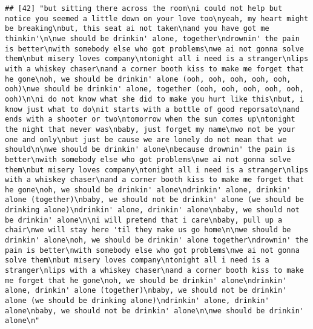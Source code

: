 \documentclass[]{article}
\begin{document}
\begin{verbatim}
## [42] "but sitting there across the room\ni could not help but notice you seemed a little down on your love too\nyeah, my heart might be breaking\nbut, this seat ai not taken\nand you have got me thinkin'\n\nwe should be drinkin' alone, together\ndrownin' the pain is better\nwith somebody else who got problems\nwe ai not gonna solve them\nbut misery loves company\ntonight all i need is a stranger\nlips with a whiskey chaser\nand a corner booth kiss to make me forget that he gone\noh, we should be drinkin' alone (ooh, ooh, ooh, ooh, ooh, ooh)\nwe should be drinkin' alone, together (ooh, ooh, ooh, ooh, ooh, ooh)\n\ni do not know what she did to make you hurt like this\nbut, i know just what to do\nit starts with a bottle of good reporsato\nand ends with a shooter or two\ntomorrow when the sun comes up\ntonight the night that never was\nbaby, just forget my name\nwo not be your one and only\nbut just be cause we are lonely do not mean that we should\n\nwe should be drinkin' alone\nbecause drownin' the pain is better\nwith somebody else who got problems\nwe ai not gonna solve them\nbut misery loves company\ntonight all i need is a stranger\nlips with a whiskey chaser\nand a corner booth kiss to make me forget that he gone\noh, we should be drinkin' alone\ndrinkin' alone, drinkin' alone (together)\nbaby, we should not be drinkin' alone (we should be drinking alone)\ndrinkin' alone, drinkin' alone\nbaby, we should not be drinkin' alone\n\ni will pretend that i care\nbaby, pull up a chair\nwe will stay here 'til they make us go home\n\nwe should be drinkin' alone\noh, we should be drinkin' alone together\ndrownin' the pain is better\nwith somebody else who got problems\nwe ai not gonna solve them\nbut misery loves company\ntonight all i need is a stranger\nlips with a whiskey chaser\nand a corner booth kiss to make me forget that he gone\noh, we should be drinkin' alone\ndrinkin' alone, drinkin' alone (together)\nbaby, we should not be drinkin' alone (we should be drinking alone)\ndrinkin' alone, drinkin' alone\nbaby, we should not be drinkin' alone\n\nwe should be drinkin' alone\n"                                                                                                                                                                                                                                                                                                                                                                                                                                                                                                                                                                                                                                                                                                                                                                                         

\end{verbatim}
\end{document}

